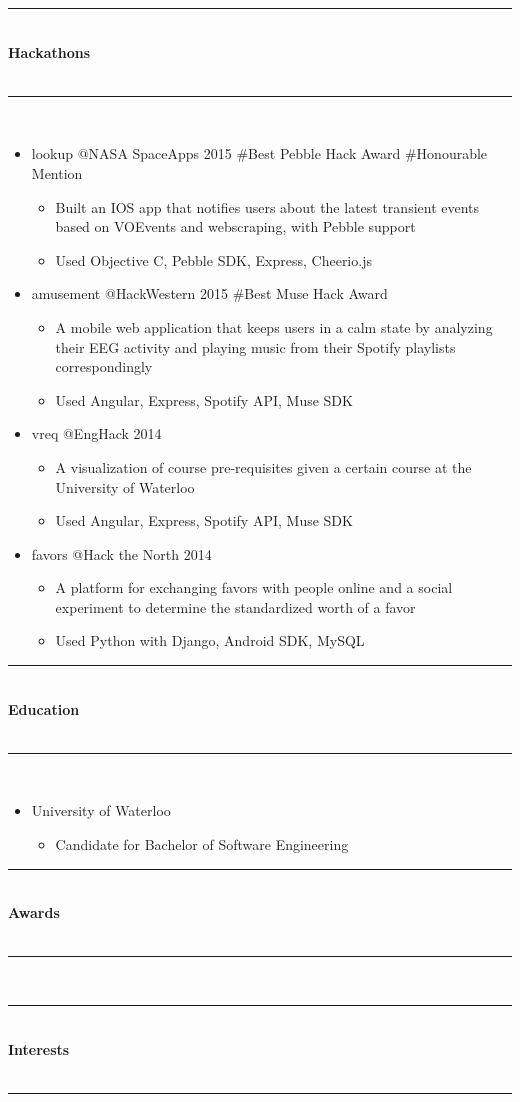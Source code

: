 \documentclass[10pt]{article}
\makeatletter
\newcommand{\cvsectiontitle}[1]{%
	\rule{\linewidth}{0.2mm}\\%
		{\large\indent\textbf{#1}}\\%
	\\[-6.5mm]\rule{\linewidth}{0.2mm}\\[2mm]%
	}
\newcommand{\cvcompany}[2]{{#1}\hspace{\stretch{3}}{(#2)}}
\newcommand{\cvhackathonproject}[2]{{#1} @{#2}}
\newcommand{\cvsublevel}[1]{\begin{itemize}[leftmargin=0.5cm] #1\end{itemize}}
\newcommand{\cvsubbullet}[1]{\vspace{-1mm}\item #1}
\makeatother
\begin{document}
\cvsectiontitle{Hackathons}
\vspace{-0.8cm}
\begin{itemize}[leftmargin=0.5cm]
\item \cvhackathonproject{lookup}{NASA SpaceApps 2015 \#Best Pebble Hack Award \#Honourable Mention}\cvsublevel{
	\cvsubbullet{Built an IOS app that notifies users about the latest transient events based on VOEvents and webscraping, with Pebble support}
	\cvsubbullet{Used Objective C, Pebble SDK, Express, Cheerio.js}
}
\item \cvhackathonproject{amusement}{HackWestern 2015 \#Best Muse Hack Award}\cvsublevel{
	\cvsubbullet{A mobile web application that keeps users in a calm state by analyzing their EEG activity and playing music from their Spotify playlists correspondingly}
	\cvsubbullet{Used Angular, Express, Spotify API, Muse SDK}
}
\item \cvhackathonproject{vreq}{EngHack 2014}\cvsublevel{
	\cvsubbullet{A visualization of course pre-requisites given a certain course at the University of Waterloo}
	\cvsubbullet{Used Angular, Express, Spotify API, Muse SDK}
}
\item \cvhackathonproject{favors}{Hack the North 2014}\cvsublevel{
	\cvsubbullet{A platform for exchanging favors with people online and a social experiment to determine the standardized worth of a favor}
	\cvsubbullet{Used Python with Django, Android SDK, MySQL}
}
\end{itemize}

\vspace{-2.5mm}
\cvsectiontitle{Education}
\vspace{-0.8cm}
\begin{itemize}[leftmargin=0.5cm]
\item \cvcompany{University of Waterloo}{September 2013 - May 2018}\cvsublevel{
	\cvsubbullet{Candidate for Bachelor of Software Engineering}
}
\end{itemize}

\vspace{-2.5mm}
\cvsectiontitle{Awards}

\vspace{-2.5mm}
\cvsectiontitle{Interests}
\end{document}

